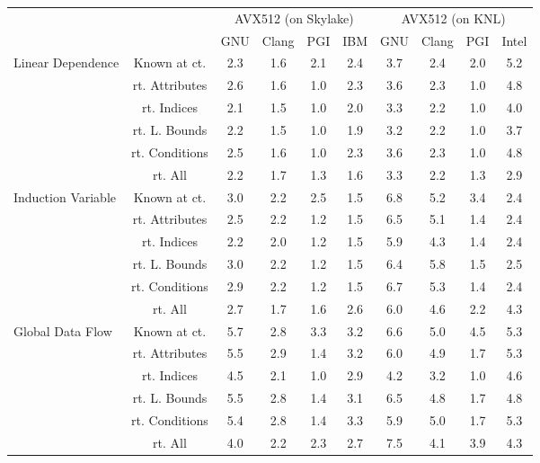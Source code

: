 \documentclass{article}
\begin{document}
\begin{longtable}{|p{2cm}||c|c|c|c|c|c|c|c|c|}
\cline{3-10} \multicolumn{2}{c|}{} & \multicolumn{4}{|c|}{ AVX512 (on Skylake)} & \multicolumn{4}{|c|}{ AVX512 (on KNL)} \\
\cline{3-10} \multicolumn{2}{c|}{}& GNU & Clang & PGI & IBM & GNU & Clang & PGI & Intel \\ \hline
\multirow{6}{*}{ \parbox{2cm}{Linear Dependence}} & Known at ct. & 2.3 & 1.6 & 2.1 & 2.4 & 3.7 & 2.4 & 2.0 & 5.2\\ \cline{2-10}
 & rt. Attributes & 2.6 & 1.6 & 1.0 & 2.3 & 3.6 & 2.3 & 1.0 & 4.8\\ \cline{2-10}
 & rt. Indices & 2.1 & 1.5 & 1.0 & 2.0 & 3.3 & 2.2 & 1.0 & 4.0\\ \cline{2-10}
 & rt. L. Bounds & 2.2 & 1.5 & 1.0 & 1.9 & 3.2 & 2.2 & 1.0 & 3.7\\ \cline{2-10}
 & rt. Conditions & 2.5 & 1.6 & 1.0 & 2.3 & 3.6 & 2.3 & 1.0 & 4.8\\ \cline{2-10}
 & rt. All & 2.2 & 1.7 & 1.3 & 1.6 & 3.3 & 2.2 & 1.3 & 2.9\\ \cline{2-10}
\hline
\multirow{6}{*}{ \parbox{2cm}{Induction Variable}} & Known at ct. & 3.0 & 2.2 & 2.5 & 1.5 & 6.8 & 5.2 & 3.4 & 2.4\\ \cline{2-10}
 & rt. Attributes & 2.5 & 2.2 & 1.2 & 1.5 & 6.5 & 5.1 & 1.4 & 2.4\\ \cline{2-10}
 & rt. Indices & 2.2 & 2.0 & 1.2 & 1.5 & 5.9 & 4.3 & 1.4 & 2.4\\ \cline{2-10}
 & rt. L. Bounds & 3.0 & 2.2 & 1.2 & 1.5 & 6.4 & 5.8 & 1.5 & 2.5\\ \cline{2-10}
 & rt. Conditions & 2.9 & 2.2 & 1.2 & 1.5 & 6.7 & 5.3 & 1.4 & 2.4\\ \cline{2-10}
 & rt. All & 2.7 & 1.7 & 1.6 & 2.6 & 6.0 & 4.6 & 2.2 & 4.3\\ \cline{2-10}
\hline
\multirow{6}{*}{ \parbox{2cm}{Global Data Flow}} & Known at ct. & 5.7 & 2.8 & 3.3 & 3.2 & 6.6 & 5.0 & 4.5 & 5.3\\ \cline{2-10}
 & rt. Attributes & 5.5 & 2.9 & 1.4 & 3.2 & 6.0 & 4.9 & 1.7 & 5.3\\ \cline{2-10}
 & rt. Indices & 4.5 & 2.1 & 1.0 & 2.9 & 4.2 & 3.2 & 1.0 & 4.6\\ \cline{2-10}
 & rt. L. Bounds & 5.5 & 2.8 & 1.4 & 3.1 & 6.5 & 4.8 & 1.7 & 4.8\\ \cline{2-10}
 & rt. Conditions & 5.4 & 2.8 & 1.4 & 3.3 & 5.9 & 5.0 & 1.7 & 5.3\\ \cline{2-10}
 & rt. All & 4.0 & 2.2 & 2.3 & 2.7 & 7.5 & 4.1 & 3.9 & 4.3\\ \cline{2-10}

\end{longtable}
\end{document}
